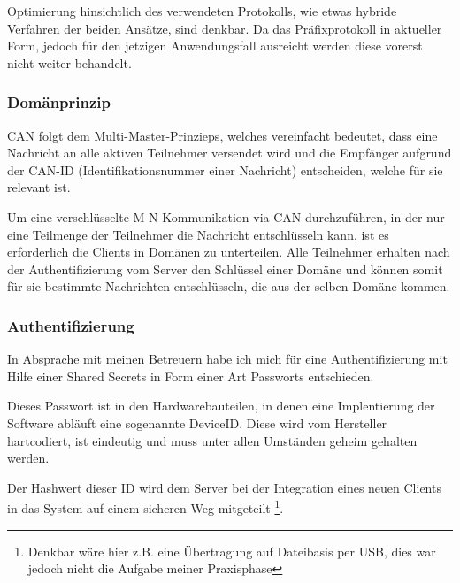 Optimierung hinsichtlich des verwendeten Protokolls, wie etwas hybride Verfahren der beiden Ansätze, sind denkbar. Da das Präfixprotokoll in aktueller Form, jedoch für den jetzigen Anwendungsfall ausreicht werden diese vorerst nicht weiter behandelt.


\subsubsection{Domänprinzip}

CAN folgt dem Multi-Master-Prinzieps, welches vereinfacht bedeutet, dass eine Nachricht an alle aktiven Teilnehmer versendet wird und die Empfänger aufgrund der CAN-ID (Identifikationsnummer einer Nachricht) entscheiden, welche für sie relevant ist. 

Um eine verschlüsselte M-N-Kommunikation via CAN durchzuführen, in der nur eine Teilmenge der Teilnehmer die Nachricht entschlüsseln kann, ist es erforderlich die Clients in Domänen zu unterteilen. Alle Teilnehmer erhalten nach der Authentifizierung vom Server den Schlüssel einer Domäne und können somit für sie bestimmte Nachrichten entschlüsseln, die aus der selben Domäne kommen.

\subsubsection{Authentifizierung}
In Absprache mit meinen Betreuern habe ich mich für eine Authentifizierung mit Hilfe einer Shared Secrets in Form einer Art Passworts entschieden. 

Dieses Passwort ist in den Hardwarebauteilen, in denen eine Implentierung der Software abläuft eine sogenannte DeviceID. Diese wird vom Hersteller hartcodiert, ist eindeutig und muss unter allen Umständen geheim gehalten werden. 

Der Hashwert dieser ID wird dem Server bei der Integration eines neuen Clients in das System auf einem sicheren Weg mitgeteilt
\footnote{Denkbar wäre hier z.B. eine Übertragung auf Dateibasis per USB, dies war jedoch nicht die Aufgabe meiner Praxisphase}.

